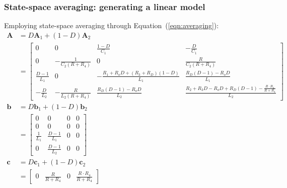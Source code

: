 \subsubsection{State-space averaging: generating a linear model}
Employing state-space averaging through Equation~(\ref{eqn:averaging}):
\begin{align}
\boldsymbol{A} &= D \boldsymbol{A}_1 + (1 - D) \boldsymbol{A}_2
\nonumber
\\[11pt]
&= \begin{bmatrix}
0 & 0 & \frac{1 - D}{C_1} & \minus\frac{D}{C_1}\\
0 & \minus\frac{1}{C_2(R + R_4)} & 0 & \frac{R}{C_2(R + R_4)}\\
\frac{D - 1}{L_1} & 0 & \minus\frac{R_1 + R_o D + (R_3 + R_D)(1 - D)}{L_1} & \frac{R_D (D - 1) - R_o D}{L_1}\\
\minus\frac{D}{L_2} & \minus\frac{R}{L_2(R + R_4)} & \frac{R_D (D - 1) - R_o D}{L_2} & \frac{R_2 + R_3 D - R_o D + R_D (D - 1) - \frac{R \cdot R_4}{R + R_4}}{L_2}
\end{bmatrix}
\label{eqn:A_avg}
\\[11pt]
\boldsymbol{b} &= D \boldsymbol{b}_1 + (1 - D) \boldsymbol{b}_2
\nonumber
\\[11pt]
&= \begin{bmatrix}
0 & 0 & 0 & 0\\
0 & 0 & 0 & 0\\
\frac{1}{L_1} & \frac{D - 1}{L_1} & 0 & 0\\
0 & \frac{D - 1}{L_2} & 0 & 0
\end{bmatrix}
\\[11pt]
\boldsymbol{c} &= D \boldsymbol{c}_1 + (1 - D) \boldsymbol{c}_2
\nonumber
\\[11pt]
&=
\begin{bmatrix}
0 & \frac{R}{R + R_4} & 0 & \frac{R \cdot R_4}{R + R_4}
\end{bmatrix}
\label{eqn:c_avg}
\end{align}
